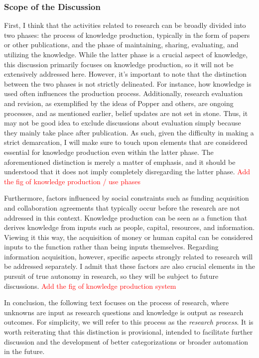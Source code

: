 \documentclass{book}
\begin{document}
\subsubsection{Scope of the Discussion}
First, I think that the activities related to research can be broadly divided into two phases: the process of knowledge production, typically in the form of papers or other publications, and the phase of maintaining, sharing, evaluating, and utilizing the knowledge. While the latter phase is a crucial aspect of knowledge, this discussion primarily focuses on knowledge production, so it will not be extensively addressed here. However, it's important to note that the distinction between the two phases is not strictly delineated. For instance, how knowledge is used often influences the production process. Additionally, research evaluation and revision, as exemplified by the ideas of Popper and others, are ongoing processes, and as mentioned earlier, belief updates are not set in stone. Thus, it may not be good idea to exclude discussions about evaluation simply because they mainly take place after publication. As such, given the difficulty in making a strict demarcation, I will make sure to touch upon elements that are considered essential for knowledge production even within the latter phase. The aforementioned distinction is merely a matter of emphasis, and it should be understood that it does not imply completely disregarding the latter phase. \textcolor{red}{Add the fig of knowledge production / use phases}

Furthermore, factors influenced by social constraints such as funding acquisition and collaboration agreements that typically occur before the research are not addressed in this context. Knowledge production can be seen as a function that derives knowledge from inputs such as people, capital, resources, and information. Viewing it this way, the acquisition of money or human capital can be considered inputs to the function rather than being inputs themselves. Regarding information acquisition, however, specific aspects strongly related to research will be addressed separately. I admit that these factors are also crucial elements in the pursuit of true autonomy in research, so they will be subject to future discussions. \textcolor{red}{Add the fig of knowledge production system}

In conclusion, the following text focuses on the process of research, where unknowns are input as research questions and knowledge is output as research outcomes. For simplicity, we will refer to this process as the \textit{research process}. It is worth reiterating that this distinction is provisional, intended to facilitate further discussion and the development of better categorizations or broader automation in the future.
\end{document}
